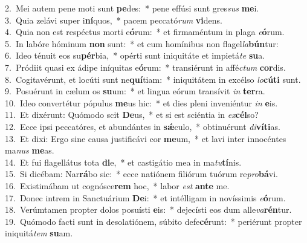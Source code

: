 {2.~}Mei autem pene moti sunt \textbf{pe}des:~* pene effúsi sunt gres\textit{sus} \textbf{me}i.\\
{3.~}Quia zelávi super i\textbf{ní}quos,~* pacem peccató\textit{rum} \textbf{vi}dens.\\
{4.~}Quia non est respéctus morti e\textbf{ó}rum:~* et firmaméntum in plaga \textit{e}\textbf{ó}rum.\\
{5.~}In labóre hóminum \textbf{non} sunt:~* et cum homínibus non flagel\textit{la}\textbf{bún}tur:\\
{6.~}Ideo ténuit eos su\textbf{pér}bia,~* opérti sunt iniquitáte et impietá\textit{te} \textbf{su}a.\\
{7.~}Pródiit quasi ex ádipe iníquitas e\textbf{ó}rum:~* transiérunt in affé\textit{ctum} \textbf{cor}dis.\\
{8.~}Cogitavérunt, et locúti sunt ne\textbf{quí}tiam:~* iniquitátem in excélso \textit{lo}\textbf{cú}\textbf{ti} sunt.\\
{9.~}Posuérunt in cælum os \textbf{su}um:~* et lingua eórum transívit \textit{in} \textbf{ter}ra.\\
{10.~}Ideo convertétur pópulus \textbf{me}us hic:~* et dies pleni inveniéntur \textit{in} \textbf{e}is.\\
{11.~}Et dixérunt: Quómodo scit \textbf{De}us,~* et si est sciéntia in \textit{ex}\textbf{cél}so?\\
{12.~}Ecce ipsi peccatóres, et abundántes in \textbf{sǽ}culo,~* obtinuérunt \textit{di}\textbf{ví}\textbf{ti}as.\\
{13.~}Et dixi: Ergo sine causa justificávi cor \textbf{me}um,~* et lavi inter innocéntes ma\textit{nus} \textbf{me}as.\\
{14.~}Et fui flagellátus tota \textbf{di}e,~* et castigátio mea in ma\textit{tu}\textbf{tí}nis.\\
{15.~}Si dicébam: Nar\textbf{rá}bo sic:~* ecce natiónem filiórum tuórum re\textit{pro}\textbf{bá}vi.\\
{16.~}Existimábam ut cognósce\textbf{rem} hoc,~* labor \textit{est} \textbf{an}\textbf{te} me.\\
{17.~}Donec intrem in Sanctuárium \textbf{De}i:~* et intélligam in novíssimis \textit{e}\textbf{ó}rum.\\
{18.~}Verúmtamen propter dolos posuísti \textbf{e}is:~* dejecísti eos dum alle\textit{va}\textbf{rén}tur.\\
{19.~}Quómodo facti sunt in desolatiónem, súbito defe\textbf{cé}runt:~* periérunt propter iniquitá\textit{tem} \textbf{su}am.\\

